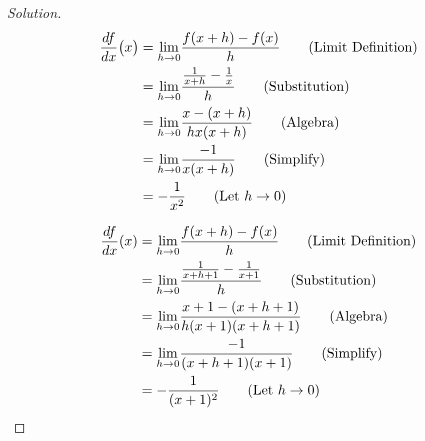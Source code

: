 \documentclass[crop=false,class=article,oneside]{standalone}
\begin{document}
            \begin{proof}[Solution]
                \par\hfill\par
                \begin{minipage}[b]{.49\textwidth}
                    \centering
                    \begin{align*}
                        \frac{df}{dx}\big(x\big)
                        &=\underset{h\rightarrow{0}}{\lim}
                            \frac{f(x+h)-f(x)}{h}
                            \tag{Limit Definition}\\
                        &=\underset{h\rightarrow{0}}{\lim}
                            \frac{\frac{1}{x+h}-\frac{1}{x}}{h}
                            \tag{Substitution}\\
                        &=\underset{h\rightarrow{0}}{\lim}
                            \frac{x-(x+h)}{hx(x+h)}
                            \tag{Algebra}\\
                        &=\underset{h\rightarrow{0}}{\lim}
                            \frac{-1}{x(x+h)}
                            \tag{Simplify}\\
                        &=-\frac{1}{x^{2}}
                            \tag{Let $h\rightarrow{0}$}
                    \end{align*}
                \end{minipage}
                \hfill
                \vline
                \begin{minipage}[b]{.49\textwidth}
                    \centering
                    \begin{align*}
                        \frac{df}{dx}(x)
                        &=\underset{h\rightarrow 0}{\lim}
                            \frac{f(x+h)-f(x)}{h}
                            \tag{Limit Definition}\\
                        &=\underset{h\rightarrow 0}{\lim}
                            \frac{\frac{1}{x+h+1}-\frac{1}{x+1}}{h}
                            \tag{Substitution}\\
                        &=\underset{h\rightarrow 0}{\lim}
                            \frac{x+1-(x+h+1)}{h(x+1)(x+h+1)}
                            \tag{Algebra}\\
                        &=\underset{h\rightarrow 0}{\lim}
                            \frac{-1}{(x+h+1)(x+1)}
                            \tag{Simplify}\\
                        &=-\frac{1}{(x+1)^{2}}
                            \tag{Let $h\rightarrow{0}$}
                    \end{align*}
                \end{minipage}
            \end{proof}
\end{document}
